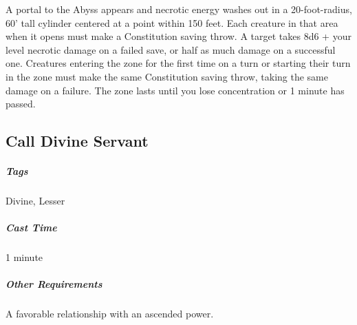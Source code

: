 A portal to the Abyss appears and necrotic energy washes out in a 20-foot-radius, 60' tall cylinder centered at a point within 150 feet. Each creature in that area when it opens must make a Constitution saving throw. A target takes 8d6 + your level necrotic damage on a failed save, or half as much damage on a successful one. Creatures entering the zone for the first time on a turn or starting their turn in the zone must make the same Constitution saving throw, taking the same damage on a failure. The zone lasts until you lose concentration or 1 minute has passed.










\subsection{Call Divine Servant}\label{spell:call-divine-servant}
\subparagraph*{Tags} Divine, Lesser
\subparagraph*{Cast Time} 1 minute
\subparagraph*{Other Requirements} A favorable relationship with an ascended power.

